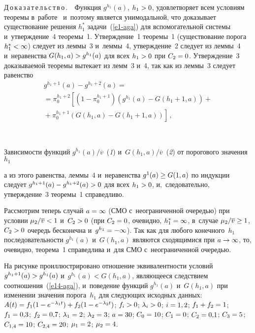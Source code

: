 \begin{multicols}{2}
  \noindent
  Д\,о\,к\,а\,з\,а\,т\,е\,л\,ь\,с\,т\,в\,о\,.\ \ Функция $g^{h_1}(a)$, 
$h_1\hm>0$, удовле\-тво\-ря\-ет всем условиям тео\-ре\-мы в~работе~\cite{9-aga} 
и~поэтому является унимодальной, что доказывает существование решения 
$h_1^*$ задачи~(\ref{e1-aga}) для вспомогательной сис\-те\-мы и~утверж\-де\-ние~4 
тео\-ре\-мы~1. Утверж\-де\-ние~1 тео\-ре\-мы~1 (существование порога 
$h_1^*\hm<\infty$) следует из леммы~3 и~леммы~4, утверж\-де\-ние~2 следует из 
леммы~4 и~неравенства $G(h_1,a)\hm> g^{h_1}(a)$ для всех $h_1\hm>0$ при 
$C_2\hm=0$. Утверж\-де\-ние~3 доказываемой тео\-ре\-мы вытекает из лемм~3 и~4, 
так как из леммы~3 следует равенство 
\begin{multline*}
  g^{h_1+1}(a) -g^{h_1+2}(a) ={}\\
  {}=\pi_0^{h_1+2}\left[ \left( 1-\pi_0^{h_1+1}\right) 
\left( g^{h_1}(a)-G\left(h_1+1,a\right)\right)+{}\right.\\
\left.{}+ \pi_0^{h_1+1} \left( G(h_1,a)-
G(h_1+1,a)\right)\right]\,,
\end{multline*}

{ \begin{center}  %
 \vspace*{-1pt}
   \mbox{%
\epsfxsize=78.211mm
}

\end{center}

\noindent
{\small
Зависимости функций $g^{h_1}(a)/\overline{v}$~(\textit{1}) и~$G(h_1,a)/\overline{v}$~(\textit{2}) от 
порогового значения~$h_1$
}
}

\vspace*{9pt}


\noindent
  а из этого равенства, леммы~4 и~неравенства $g^1(a)\hm\geq G(1,a)$ по 
индукции следует $g^{h_1+1}(a)\hm- g^{h_1+2}(a)\hm>0$ для всех $h_1\hm>0$, 
и,~следовательно, утверж\-де\-ние~3 тео\-ре\-мы~1 справедливо.
  
  Рассмотрим теперь случай $a\hm= \infty$ (СМО с~неограниченной оче\-редью) 
при условии $\mu_2/\overline{v}\hm< 1$ и~$C_2\hm>0$ (при $C_2\hm=0$, 
очевидно, $h_1^*\hm=\infty$, в~случае $\mu_2/\overline{v}\hm\geq 1$, 
$C_2\hm>0$ оче\-редь бесконечна и~$g^{h_1}\hm=-\infty$). Так как для любого 
конечного~$h_1$ по\-сле\-до\-ва\-тель\-ности $g^{h_1}(a)$ и~$G(h_1,a)$ являются 
сходящимися при $a\hm\to \infty$, то, очевидно, тео\-ре\-ма~1 справедлива и~для 
СМО с~неограниченной оче\-редью.

 
  
  На рисунке проиллюстрировано отношение эк\-ви\-ва\-лент\-ности условий 
$g^{h_1+1} (a)\hm> g^{h_1}(a)$ и~$g^{h_1}(a)< G(h_1,a)$, яв\-ля\-юще\-еся 
следствием соотношения~(\ref{e14-aga}), и~поведение функций $g^{h_1}(a)$ 
и~$G(h_1,a)$ при изменении значения порога~$h_1$ 
     для сле\-ду\-ющих исходных 
данных:  $A(t)\hm= f_1(1\hm- e^{-\lambda_1 t})\hm+ f_2(1\hm- e^{-\lambda_2t})$;
$f_i\hm> 0$; $\lambda_i\hm>0$; $i\hm= 1,2$; $f_1\hm+ f_2\hm= 1$; 
$f_1\hm= 0{,}3$; $f_2\hm= 0{,}7$; $\lambda_1\hm= 2$; $\lambda_2\hm= 3$; $a\hm=30$; 
$C_0\hm= 10$; $C_1\hm= 0$; $C_2\hm= 0{,}1$; $C_3\hm= 5$; $C_{1,4}\hm= 10$; $C_{2,4}\hm= 20$;
$\mu_1\hm=2$; $\mu_2\hm= 4$.
 

\end{multicols}
